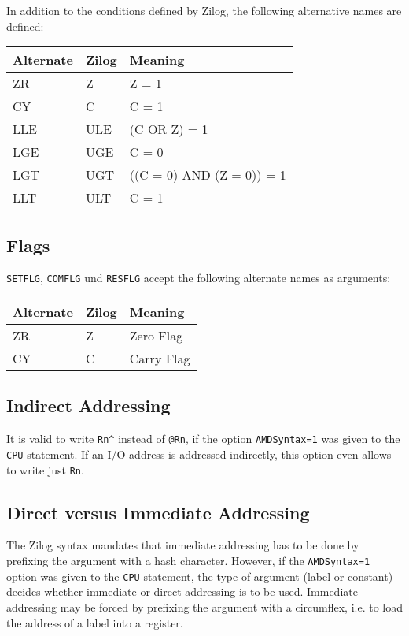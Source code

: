 \documentclass[12pt,twoside]{report}
\newcommand{\tty}[1]{{\tt #1}}
\begin{document}
In addition to the conditions defined by Zilog, the following alternative names
are defined:

\begin{center}\begin{tabular}{|l|l|l|}
\hline
Alternate & Zilog & Meaning \\
\hline
\hline
ZR         & Z     & Z = 1 \\
CY         & C     & C = 1 \\
LLE        & ULE   & (C OR Z) = 1 \\
LGE        & UGE   & C = 0 \\
LGT        & UGT   & ((C = 0) AND (Z = 0)) = 1 \\
LLT        & ULT   & C = 1 \\
\hline
\end{tabular}\end{center}

\subsection{Flags}

\tty{SETFLG}, \tty{COMFLG} und \tty{RESFLG} accept the following alternate names
as arguments:

\begin{center}\begin{tabular}{|l|l|l|}
\hline
Alternate & Zilog & Meaning \\
\hline
\hline
ZR         & Z     & Zero Flag \\
CY         & C     & Carry Flag \\
\hline
\end{tabular}\end{center}

\subsection{Indirect Addressing}

It is valid to write \verb!Rn^! instead of \verb!@Rn!, if the option
\tty{AMDSyntax=1} was given to the \tty{CPU} statement.  If an I/O address
is addressed indirectly, this option even allows to write just \verb!Rn!.

\subsection{Direct versus Immediate Addressing}

The Zilog syntax mandates that immediate addressing has to be done by prefixing
the argument with a hash character.  However, if the \tty{AMDSyntax=1} option
was given to the \tty{CPU} statement, the type of argument (label or constant)
decides whether immediate or direct addressing is to be used.  Immediate addressing
may be forced by prefixing the argument with a circumflex, i.e. to load the address
of a label into a register.
\end{document}
